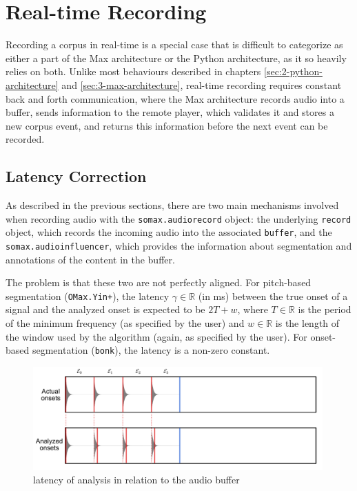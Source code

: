 \chapter{Real-time Recording}\label{sec:4-realtime-recording}
Recording a corpus in real-time is a special case that is difficult to categorize as either a part of the Max architecture or the Python architecture, as it so heavily relies on both. Unlike most behaviours described in chapters \ref{sec:2-python-architecture} and \ref{sec:3-max-architecture}, real-time recording requires constant back and forth communication, where the Max architecture records audio into a buffer, sends information to the remote player, which validates it and stores a new corpus event, and returns this information before the next event can be recorded. 



\section{Latency Correction}\label{ssec:4-latency-correction}

As described in the previous sections, there are two main mechanisms involved when recording audio with the \texttt{somax.audiorecord} object: the underlying \texttt{record} object, which records the incoming audio into the associated \texttt{buffer}, and the \texttt{somax.audioinfluencer}, which provides the information about segmentation and annotations of the content in the buffer. 

The problem is that these two are not perfectly aligned. For pitch-based segmentation (\texttt{OMax.Yin+}), the latency $\gamma \in \mathbb R$ (in ms) between the true onset of a signal and the analyzed onset is expected to be $2T + w$, where $T \in \mathbb R$ is the period of the minimum frequency (as specified by the user) and $w \in \mathbb R$  is the length of the window used by the algorithm (again, as specified by the user). For onset-based segmentation (\texttt{bonk}), the latency is a non-zero constant.

 \begin{figure}[h!]
    \centering        
 	\includegraphics[width=0.99\textwidth, keepaspectratio]{figures/latency2.png}
    \caption{latency of analysis in relation to the audio buffer}
    \label{fig:4-latency1}
\end{figure}


